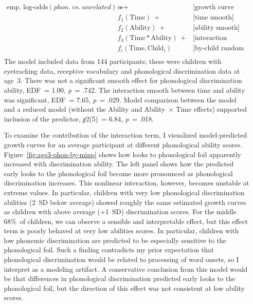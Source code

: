 \documentclass [11pt, proquest] {uwthesis}[2015/03/03]
\begin{document}
\small
\begin{align*}
   \text{emp. log-odds}(\mathit{phon.\ vs.\ unrelated}) =\
   & \alpha +\ &\text{[growth curve average]} \\
   & f_1(\text{Time})\ +                    &\text{[time smooth]} \\
   & f_2(\text{Ability})\ +                 &\text{[ability smooth]} \\
   & f_3(\text{Time} * \text{Ability})\ +   &\text{[interaction smooth]} \\
   & f_i(\text{Time}, \text{Child}_i)       &\text{[by-child random smooths]} \\
\end{align*}
The model included data from 144 participants; these were children with
eyetracking data, receptive vocabulary and phonological discrimination
data at age~3. There was not a significant smooth effect for
phonological discrimination ability, EDF~= 1.00, \emph{p}~= .742. The
interaction smooth between time and ability was significant, EDF~= 7.65,
\emph{p}~= .029. Model comparison between the model and a reduced model
(without the Ability and Ability~× Time effects) supported inclusion of
the predictor, \emph{χ}2(5)~= 6.84, \emph{p}~= .018.

To examine the contribution of the interaction term, I visualized
model-predicted growth curves for an average participant at different
phonological ability scores. Figure~\ref{fig:age3-phon-by-minp} shows
how looks to phonological foil apparently increased with discrimination
ability. The left panel shows how the predicted early looks to the
phonological foil become more pronounced as phonological discrimination
increases. This nonlinear interaction, however, becomes unstable at
extreme values. In particular, children with very low phonological
discrimination abilities (2~SD below average) showed roughly the same
estimated growth curves as children with above average (+1~SD)
discrimination scores. For the middle 68\%~of children, we can observe a
sensible and interpretable effect, but this effect term is poorly
behaved at very low abilities scores. In particular, children with low
phonemic discrimination are predicted to be especially sensitive to the
phonological foil. Such a finding contradicts my prior expectation that
phonological discrimination would be related to processing of word
onsets, so I interpret as a modeling artifact. A conservative conclusion
from this model would be that differences in phonological discrimination
predicted early looks to the phonological foil, but the direction of
this effect was not consistent at low ability scores.
\end{document}
